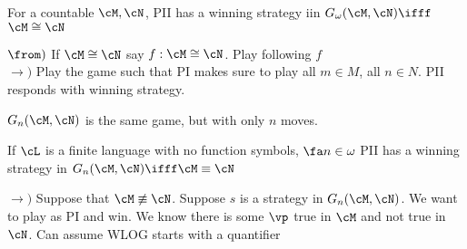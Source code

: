 \begin{theorem}
    For a countable $\cM, \cN$, PII has a winning strategy iin $G_{\omega}(\cM, \cN) \ifff$ $\cM \cong \cN$ 
\end{theorem}

\begin{pf}
    $\from)$ If $\cM \cong \cN$ say $f: \cM \cong \cN$. Play following $f$ \\
    $\to)$ Play the game such that PI makes sure to play all $m \in M$, all $n \in N$. PII responds with winning strategy. 
\end{pf}

\noindent
$G_n(\cM, \cN)$ is the same game, but with only $n$ moves. 

\begin{theorem}
    If $\cL$ is a finite language with no function symbols, $\fa n \in \omega$ PII has a winning strategy in $G_n(\cM, \cN) \ifff \cM \equiv \cN$ 
\end{theorem}

\begin{pf}
    $\to)$ Suppose that $\cM \not\equiv \cN$. Suppose $s$ is a strategy in $G_n(\cM, \cN)$. We want to play as PI and win. We know there is some $\vp$ true in $\cM$ and not true in $\cN$. Can assume WLOG starts with a quantifier 
\end{pf}